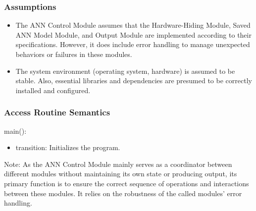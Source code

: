 \documentclass[12pt, titlepage]{article}
\begin{document}

\subsubsection{Assumptions}
\begin{itemize}
  \item The ANN Control Module assumes that the Hardware-Hiding Module, Saved ANN Model Module, and Output Module are implemented 
  according to their specifications. However, it does include error handling to manage unexpected behaviors or failures in these modules.
  \item The system environment (operating system, hardware) is assumed to be stable. 
  Also, essential libraries and dependencies are presumed to be correctly installed and configured.
\end{itemize}



\subsubsection{Access Routine Semantics}

\noindent main():
\begin{itemize}
  \item transition: Initializes the program.
\end{itemize}

Note: As the ANN Control Module mainly serves as a coordinator between different modules 
without maintaining its own state or producing output, its primary function is to ensure 
the correct sequence of operations and interactions between these modules. It relies on 
the robustness of the called modules' error handling.



\end{document}
